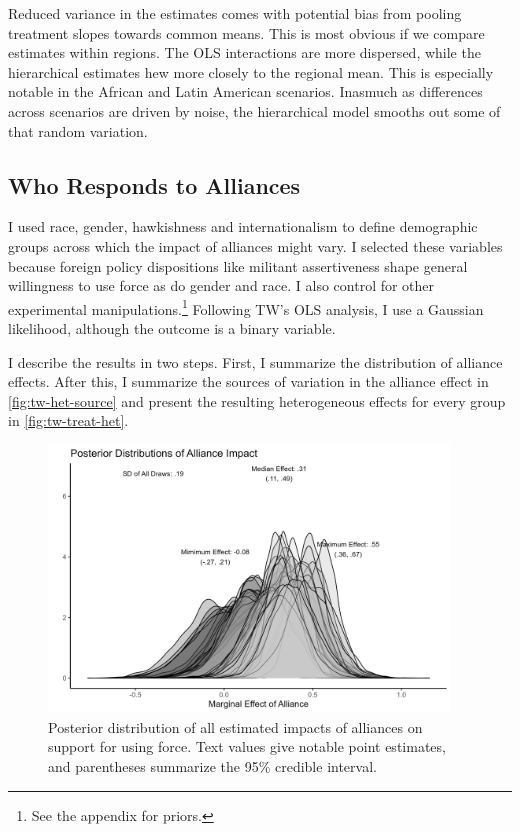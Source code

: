 \documentclass[12pt]{article}
\begin{document}
Reduced variance in the estimates comes with potential bias from pooling treatment slopes towards common means.
This is most obvious if we compare estimates within regions. 
The OLS interactions are more dispersed, while the hierarchical estimates hew more closely to the regional mean.
This is especially notable in the African and Latin American scenarios. 
Inasmuch as differences across scenarios are driven by noise, the hierarchical model smooths out some of that random variation.



\subsection{Who Responds to Alliances}

I used race, gender, hawkishness and internationalism to define demographic groups across which the impact of alliances might vary. 
I selected these variables because foreign policy dispositions like militant assertiveness shape general willingness to use force \citep{Kertzeretal2014} as do gender \citep{Barnhartetal2020} and race. 
I also control for other experimental manipulations.\footnote{See the appendix for priors.} 
Following TW's OLS analysis, I use a Gaussian likelihood, although the outcome is a binary variable. 


I describe the results in two steps. 
First, I summarize the distribution of alliance effects. 
After this, I summarize the sources of variation in the alliance effect in \autoref{fig:tw-het-source} and present the resulting heterogeneous effects for every group in \autoref{fig:tw-treat-het}.

\begin{figure}[htpb]
	\centering
		\includegraphics[width=0.95\textwidth]{../figures/tw-treat-het-sum.png}
	\caption{Posterior distribution of all estimated impacts of alliances on support for using force. Text values give notable point estimates, and parentheses summarize the 95\% credible interval.}
	\label{fig:tw-treat-het-sum}
\end{figure}
\end{document}
